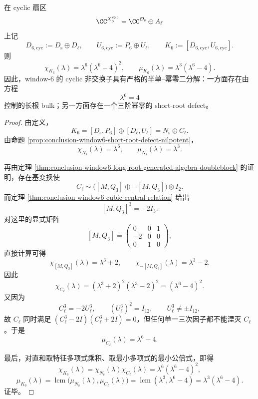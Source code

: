 \begin{theorem}\label{thm:conclusion-window6-cyclic-commutator-minpoly-splitting}
在 cyclic 扇区
\[
\CC^{X_6^{\mathrm{cyc}}}=\CC^{\mathcal O_{\mathrm{s}}}\oplus A_{\ell}
\]
上记
\[
D_{6,\mathrm{cyc}}:=D_{\mathrm{s}}\oplus D_{\ell},
\qquad
U_{6,\mathrm{cyc}}:=P_6\oplus U_{\ell},
\qquad
K_6:=[D_{6,\mathrm{cyc}},U_{6,\mathrm{cyc}}].
\]
则
\[
\chi_{K_6}(\lambda)=\lambda^6(\lambda^6-4)^2,
\qquad
\mu_{K_6}(\lambda)=\lambda^3(\lambda^6-4).
\]
因此，window-\(6\) 的 cyclic 非交换子具有严格的半单--幂零二分解：一方面存在由方程
\[
\lambda^6=4
\]
控制的长根 bulk；另一方面存在一个三阶幂零的 short-root defect。
\end{theorem}
\begin{proof}
由定义，
\[
K_6
=
[D_{\mathrm{s}},P_6]\oplus [D_{\ell},U_{\ell}]
=
N_{\mathrm{s}}\oplus C_{\ell}.
\]
由命题 \ref{prop:conclusion-window6-short-root-defect-nilpotent}，
\[
\chi_{N_{\mathrm{s}}}(\lambda)=\lambda^6,
\qquad
\mu_{N_{\mathrm{s}}}(\lambda)=\lambda^3.
\]

再由定理 \ref{thm:conclusion-window6-long-root-generated-algebra-doubleblock} 的证明，存在基变换使
\[
C_{\ell}\sim \bigl([M,Q_3]\oplus -[M,Q_3]\bigr)\otimes I_2.
\]
而定理 \ref{thm:conclusion-window6-cubic-central-relation} 给出
\[
[M,Q_3]^3=-2I_3.
\]
对这里的显式矩阵
\[
[M,Q_3]=
\begin{pmatrix}
0&0&1\\
-2&0&0\\
0&1&0
\end{pmatrix},
\]
直接计算可得
\[
\chi_{[M,Q_3]}(\lambda)=\lambda^3+2,
\qquad
\chi_{-[M,Q_3]}(\lambda)=\lambda^3-2.
\]
因此
\[
\chi_{C_{\ell}}(\lambda)
=(\lambda^3+2)^2(\lambda^3-2)^2
=(\lambda^6-4)^2.
\]
又因为
\[
C_{\ell}^3=-2U_{\ell}^3,
\qquad
(U_{\ell}^3)^2=I_{12},
\qquad
U_{\ell}^3\neq \pm I_{12},
\]
故 \(C_{\ell}\) 同时满足 \((C_{\ell}^3-2I)(C_{\ell}^3+2I)=0\)，但任何单一三次因子都不能湮灭 \(C_{\ell}\)。于是
\[
\mu_{C_{\ell}}(\lambda)=\lambda^6-4.
\]

最后，对直和取特征多项式乘积、取最小多项式的最小公倍式，即得
\[
\chi_{K_6}(\lambda)=\chi_{N_{\mathrm{s}}}(\lambda)\chi_{C_{\ell}}(\lambda)
=\lambda^6(\lambda^6-4)^2,
\]
\[
\mu_{K_6}(\lambda)
=
\operatorname{lcm}\bigl(\mu_{N_{\mathrm{s}}}(\lambda),\mu_{C_{\ell}}(\lambda)\bigr)
=
\operatorname{lcm}(\lambda^3,\lambda^6-4)
=
\lambda^3(\lambda^6-4).
\]
证毕。
\end{proof}

